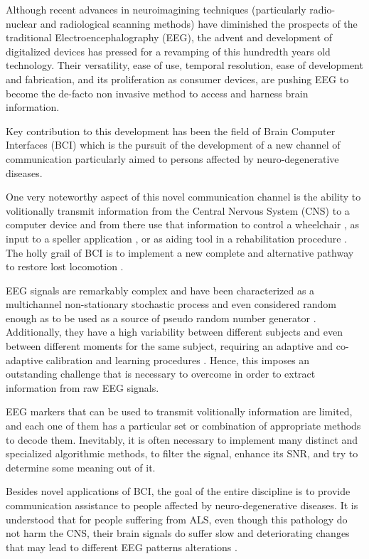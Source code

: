 \documentclass[entropy,article,submit,moreauthors,pdftex,10pt,a4paper]{mdpi}
\begin{document}
Although recent advances in neuroimagining techniques (particularly radio-nuclear and radiological scanning methods) \citep{Schomer2010} have diminished the prospects of the traditional Electroencephalography (EEG), the advent and development of digitalized devices has pressed for a revamping of this hundredth years old technology.  Their versatility, ease of use, temporal resolution, ease of development and fabrication, and its proliferation as consumer devices, are pushing EEG to become the de-facto non invasive method to access and harness brain information.

Key contribution to this development has been the field of Brain Computer Interfaces (BCI) \citep{WolpawJonathanR2012} which is the pursuit of the development of a new channel of communication particularly aimed to persons affected by neuro-degenerative diseases.

One very noteworthy aspect of this novel communication channel is the ability to volitionally transmit information from the Central Nervous System (CNS) to a computer device and from there use that information to control a wheelchair \citep{Carlson2013}, as input to a speller application \citep{Guger2009a}, or as aiding tool in a rehabilitation procedure \citep{Jure2016}.  The holly grail of BCI is to implement a new complete and alternative pathway to restore lost locomotion \citep{WolpawJonathanR2012}.

EEG signals are remarkably complex and have been characterized as a multichannel non-stationary stochastic process and even considered random enough as to be used as a source of pseudo random number generator \citep{Chen2014}. Additionally, they have a high variability between different subjects and even between different moments for the same subject, requiring an adaptive and co-adaptive calibration and learning procedures \citep{Clerc}.  Hence, this imposes an outstanding challenge that is necessary to overcome in order to extract information from raw EEG signals.

EEG markers \citep{Clerc} that can be used to transmit volitionally information are limited, and each one of them has a particular set or combination of appropriate methods to decode them. Inevitably, it is often necessary to implement many distinct and specialized algorithmic methods, to filter the signal, enhance its SNR, and try to determine some meaning out of it.  

Besides novel applications of BCI, the goal of the entire discipline is to provide communication assistance to people affected by neuro-degenerative diseases.  It is understood that for people suffering from ALS, even though this pathology do not harm the CNS, their brain signals do suffer slow and deteriorating changes that may lead to different EEG patterns alterations \citep{Nijboer2009,Riener2014}.
\end{document}

